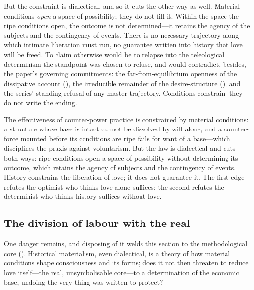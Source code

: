 But the constraint is dialectical, and so it cuts the other way as well. Material conditions \emph{open} a space of possibility; they do not fill it. Within the space the ripe conditions open, the outcome is not determined---it retains the agency of the subjects and the contingency of events. There is no necessary trajectory along which intimate liberation must run, no guarantee written into history that love will be freed. To claim otherwise would be to relapse into the teleological determinism the standpoint was chosen to refuse, and would contradict, besides, the paper's governing commitments: the far-from-equilibrium openness of the dissipative account (), the irreducible remainder of the desire-structure (), and the series' standing refusal of any master-trajectory. Conditions constrain; they do not write the ending.

\begin{claim}
The effectiveness of counter-power practice is constrained by material conditions: a structure whose base is intact cannot be dissolved by will alone, and a counter-force mounted before its conditions are ripe fails for want of a base---which disciplines the praxis against voluntarism. But the law is dialectical and cuts both ways: ripe conditions open a space of possibility without determining its outcome, which retains the agency of subjects and the contingency of events. History constrains the liberation of love; it does not guarantee it. The first edge refutes the optimist who thinks love alone suffices; the second refutes the determinist who thinks history suffices without love.
\end{claim}

\subsection{The division of labour with the real}
\label{p17:sub:histmat-real}

One danger remains, and disposing of it welds this section to the methodological core (). Historical materialism, even dialectical, is a theory of how material conditions shape consciousness and its forms; does it not then threaten to reduce love itself---the real, unsymbolisable core---to a determination of the economic base, undoing the very thing  was written to protect?

